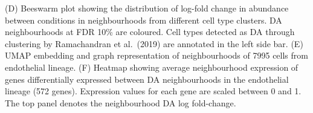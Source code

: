 \documentclass[
  10pt,
]{article}
\begin{document}
\newpage

(D) Beeswarm plot showing the distribution of log-fold change in abundance between conditions in neighbourhoods from different cell type clusters. DA neighbourhoods at FDR 10\% are coloured. Cell types detected as DA through clustering by Ramachandran et al.~(2019) are annotated in the left side bar. (E) UMAP embedding and graph representation of neighbourhoods of 7995 cells from endothelial lineage. (F) Heatmap showing average neighbourhood expression of genes differentially expressed between DA neighbourhoods in the endothelial lineage (572 genes). Expression values for each gene are scaled between 0 and 1. The top panel denotes the neighbourhood DA log fold-change.
\end{document}
